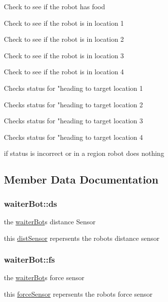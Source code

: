 Check to see if the robot has food

Check to see if the robot is in location 1

Check to see if the robot is in location 2

Check to see if the robot is in location 3

Check to see if the robot is in location 4

Checks status for "heading to target location 1

Checks status for "heading to target location 2

Checks status for "heading to target location 3

Checks status for "heading to target location 4

if status is incorrect or in a region robot does nothing

\subsection{Member Data Documentation}
\subsubsection[{\texorpdfstring{ds}{ds}}]{ waiter\+Bot\+::ds}\hypertarget{classwaiterBot_a54139b99410779ba1a3af03d45dd3dec}{}\label{classwaiterBot_a54139b99410779ba1a3af03d45dd3dec}


the \hyperlink{classwaiterBot}{waiter\+Bot}\textquotesingle{}s distance Sensor 

this \hyperlink{classdistSensor}{dist\+Sensor} repersents the robot\textquotesingle{}s distance sensor 
\subsubsection[{\texorpdfstring{fs}{fs}}]{ waiter\+Bot\+::fs}\hypertarget{classwaiterBot_a359f1ca46275a20771b0f922268fb72e}{}\label{classwaiterBot_a359f1ca46275a20771b0f922268fb72e}


the \hyperlink{classwaiterBot}{waiter\+Bot}\textquotesingle{}s force sensor 

this \hyperlink{classforceSensor}{force\+Sensor} repersents the robot\textquotesingle{}s force sensor 
